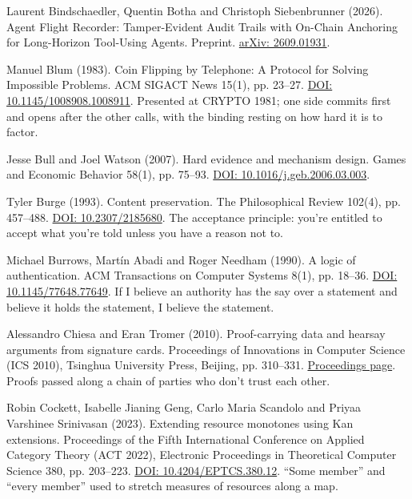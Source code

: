 \documentclass[11pt,twoside]{article}
\theoremstyle{thielethm}
\theoremstyle{thieledef}
\theoremstyle{thieledef}
\theoremstyle{thieledef}
\theoremstyle{thielethm}
\theoremstyle{thieleobs}
\theoremstyle{thielethm}
\begin{document}
\noindent Laurent Bindschaedler, Quentin Botha and Christoph Siebenbrunner (2026). Agent Flight Recorder: Tamper-Evident Audit Trails with On-Chain Anchoring for Long-Horizon Tool-Using Agents. Preprint. \href{https://arxiv.org/abs/2609.01931}{arXiv: 2609.01931}.
\par\medskip

\noindent Manuel Blum (1983). Coin Flipping by Telephone: A Protocol for Solving Impossible Problems. ACM SIGACT News 15(1), pp. 23--27. \href{https://doi.org/10.1145/1008908.1008911}{DOI: 10.1145/1008908.1008911}. Presented at CRYPTO 1981; one side commits first and opens after the other calls, with the binding resting on how hard it is to factor.
\par\medskip

\noindent Jesse Bull and Joel Watson (2007). Hard evidence and mechanism design. Games and Economic Behavior 58(1), pp. 75--93. \href{https://doi.org/10.1016/j.geb.2006.03.003}{DOI: 10.1016/j.geb.2006.03.003}.
\par\medskip

\noindent Tyler Burge (1993). Content preservation. The Philosophical Review 102(4), pp. 457--488. \href{https://doi.org/10.2307/2185680}{DOI: 10.2307/2185680}. The acceptance principle: you're entitled to accept what you're told unless you have a reason not to.
\par\medskip

\noindent Michael Burrows, Mart\'in Abadi and Roger Needham (1990). A logic of authentication. ACM Transactions on Computer Systems 8(1), pp. 18--36. \href{https://doi.org/10.1145/77648.77649}{DOI: 10.1145/77648.77649}. If I believe an authority has the say over a statement and believe it holds the statement, I believe the statement.
\par\medskip

\noindent Alessandro Chiesa and Eran Tromer (2010). Proof-carrying data and hearsay arguments from signature cards. Proceedings of Innovations in Computer Science (ICS 2010), Tsinghua University Press, Beijing, pp. 310--331. \href{https://conference.iiis.tsinghua.edu.cn/ICS2010/content/papers/25.html}{Proceedings page}. Proofs passed along a chain of parties who don't trust each other.
\par\medskip

\noindent Robin Cockett, Isabelle Jianing Geng, Carlo Maria Scandolo and Priyaa Varshinee Srinivasan (2023). Extending resource monotones using Kan extensions. Proceedings of the Fifth International Conference on Applied Category Theory (ACT 2022), Electronic Proceedings in Theoretical Computer Science 380, pp. 203--223. \href{https://doi.org/10.4204/EPTCS.380.12}{DOI: 10.4204/EPTCS.380.12}. ``Some member'' and ``every member'' used to stretch measures of resources along a map.
\par\medskip
\end{document}
